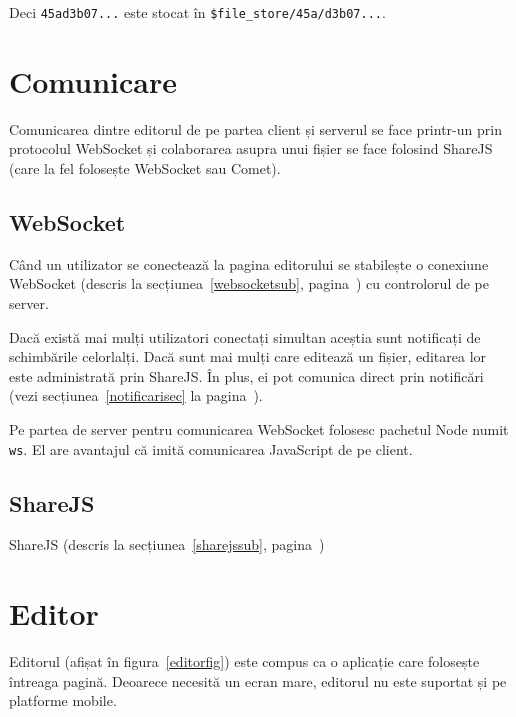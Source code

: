 \documentclass[a4wide,12pt]{report}
\newcommand{\cod}[1]{\texttt{#1}}
\newcommand{\acr}[1]{{\textsmaller[1]{\textsc{#1}}}} %
\begin{document}
Deci \cod{45ad3b07...} este stocat în \cod{\$file\_store/45a/d3b07...}.

\section{Comunicare}

Comunicarea dintre editorul de pe partea client și serverul se face printr-un
\acr{RPC} prin protocolul WebSocket și colaborarea asupra unui fișier se face
folosind ShareJS (care la fel folosește WebSocket sau Comet).

\subsection{WebSocket}

Când un utilizator se conectează la pagina editorului se stabilește o conexiune
WebSocket (descris la secțiunea~\ref{websocketsub},
pagina~\pageref{websocketsub}) cu controlorul de pe server.

Dacă există mai mulți utilizatori conectați simultan aceștia sunt notificați de
schimbările celorlalți. Dacă sunt mai mulți care editează un fișier, editarea
lor este administrată prin ShareJS. În plus, ei pot comunica direct prin
notificări (vezi secțiunea~\ref{notificarisec} la
pagina~\pageref{notificarisec}).

Pe partea de server pentru comunicarea WebSocket folosesc pachetul Node numit
\cod{ws}. El are avantajul că imită comunicarea JavaScript de pe client.

\subsection{ShareJS}

ShareJS (descris la secțiunea~\ref{sharejssub}, pagina~\pageref{sharejssub})

\section{Editor}

Editorul (afișat în figura~\ref{editorfig}) este compus ca o aplicație care
folosește întreaga pagină. Deoarece necesită un ecran mare, editorul nu este
suportat și pe platforme mobile.
\end{document}
